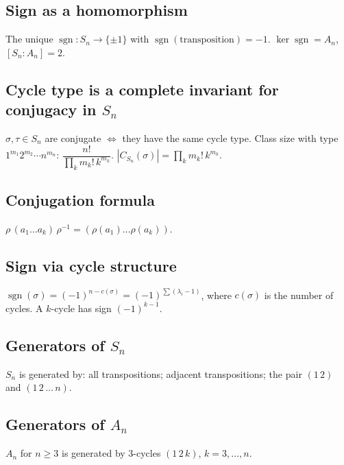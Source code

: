 \subsection{Sign as a homomorphism}
\label{subsec:sign-homomorphism}

The unique $\operatorname{sgn}:S_n\to\{\pm1\}$ with $\operatorname{sgn}(\text{transposition})=-1$. $\ker\operatorname{sgn}=A_n$, $[S_n:A_n]=2$.

\subsection{Cycle type is a complete invariant for conjugacy in $S_n$}
\label{subsec:cycle-type}

$\sigma,\tau\in S_n$ are conjugate $\Leftrightarrow$ they have the same cycle type. Class size with type $1^{m_1}2^{m_2}\cdots n^{m_n}$: $\dfrac{n!}{\prod_k m_k!\,k^{m_k}}$.
$|C_{S_n}(\sigma)|=\prod_k m_k!\,k^{m_k}$.

\subsection{Conjugation formula}
\label{subsec:conjugation-formula}

$\rho\,(a_1\dots a_k)\,\rho^{-1}=(\rho(a_1)\dots\rho(a_k))$.

\subsection{Sign via cycle structure}
\label{subsec:sign-cycle}

$\operatorname{sgn}(\sigma)=(-1)^{n-c(\sigma)}=(-1)^{\sum(\lambda_i-1)}$, where $c(\sigma)$ is the number of cycles. A $k$-cycle has sign $(-1)^{k-1}$.

\subsection{Generators of $S_n$}
\label{subsec:generators-sn}

$S_n$ is generated by: all transpositions; adjacent transpositions; the pair $(1\,2)$ and $(1\,2\,\dots\,n)$.

\subsection{Generators of $A_n$}
\label{subsec:generators-an}

$A_n$ for $n\ge3$ is generated by $3$-cycles $(1\,2\,k)$, $k=3,\dots,n$.

